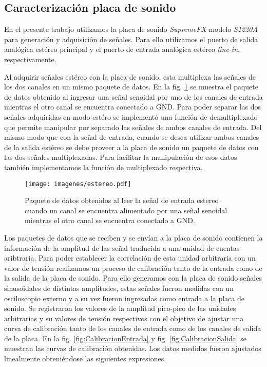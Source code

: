 \documentclass[a4paper,11pt]{article}
\begin{document}
	\subsection{Caracterización placa de sonido}
	\label{sec:caracterizacion}

En el presente trabajo utilizamos la placa de sonido \emph{SupremeFX} modelo \emph{S1220A} para generación y adquisición de señales.  Para ello
utilizamos el puerto de salida analógica estéreo principal y el puerto
de entrada analógica estéreo \emph{line-in}, respectivamente.

Al adquirir señales estéreo con la placa de sonido, esta multiplexa las
señales de los dos canales en un mismo paquete de datos. En la
fig. \ref{fig:multiplexado} se muestra el paquete de datos
obtenido al ingresar una señal senoidal por uno de los canales de
entrada mientras el otro canal se encuentra conectado a
GND.
Para poder separar las dos señales adquiridas en modo estéro se
implementó una función de demultiplexado que permite manipular por
separado las señales de ambos canales de entrada.  Del mismo modo que
con la señal de entrada, cuando se desea utilizar ambos canales de la
salida estéreo se debe proveer a la placa de sonido un paquete de datos
con las dos señales multiplexadas. Para facilitar la manipulación de esos
datos también implementamos la función de multiplexado respectiva.

    \begin{figure}[!h] 
        \centering
        \texttt{[image: imagenes/estereo.pdf]}
        \caption{Paquete de datos obtenidos al leer la señal de entrada
estereo cuando un canal se encuentra alimentado por una señal senoidal
mientras el otro canal se encuentra conectado a GND.}
        \label{fig:multiplexado} 
    \end{figure}

Los paquetes de datos que se reciben y se envían a la placa de sonido
contienen la información de la amplitud de las señal traducida a una
unidad de cuentas aribtraria. Para poder establecer la correlación de
esta unidad arbitraria con un valor de tensión realizamos un proceso de
calibración tanto de la entrada como de la salida de la placa de sonido.
Para ello generamos con la placa de sonido señales sinusoidales de
distintas amplitudes, estas señales fueron medidas con un osciloscopio
externo y a su vez fueron ingresadas como entrada a la placa de sonido.
Se registraron los valores de la amplitud pico-pico de las unidades arbitrarias y su valores de tensión respectivos con el objetivo de ajustar una curva de calibración tanto de los canales de entrada como de los canales de salida de la placa.  En la fig. \ref{fig:CalibracionEntrada} y fig. \ref{fig:CalibracionSalida} se muestran las curvas de calibración obtenidas.  Los datos medidos fueron ajustados linealmente obteniéndose las siguientes expresiones,
	
\end{document}

